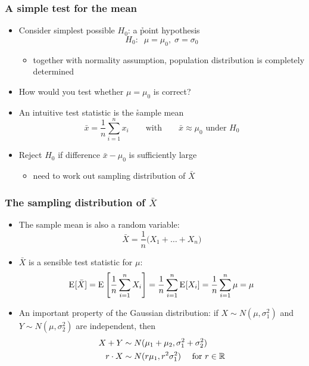 \documentclass[t]{beamer} %
\begin{document}
\begin{frame}
  \frametitle{A simple test for the mean}

  \begin{itemize}
  \item Consider simplest possible $H_0$: a \h{point hypothesis}
    \[
    H_0:\;\; \mu = \mu_0,\; \sigma = \sigma_0
    \]
    \ungap[1]
    \begin{itemize}
    \item[\hand] together with normality assumption, population distribution
      is completely determined
    \end{itemize}
  \item How would you test whether $\mu = \mu_0$ is correct?%
    \pause
  \item An intuitive test statistic is the \h{sample mean}
    \[
    \bar{x} = \frac{1}{n} \sum_{i=1}^n x_i
    \qquad \text{with} \qquad
    \bar{x}\approx \mu_0 \text{ under } H_0
    \]
  \item Reject $H_0$ if difference $\bar{x} - \mu_0$ is sufficiently large
    \begin{itemize}
    \item[\hand] need to work out sampling distribution of $\bar{X}$
    \end{itemize}
  \end{itemize}

\end{frame}

\begin{frame}
  \frametitle{The sampling distribution of $\bar{X}$}

  \begin{itemize}
  \item The sample mean is also a random variable:
    \[
    \bar{X} = \frac{1}{n} \bigl( X_1 + \dots + X_n \bigr)
    \]
  \item $\bar{X}$ is a sensible test statistic for $\mu$:
    \[
    \mathrm{E}_{}[\bar{X}] = \mathrm{E}_{}\left[ \frac{1}{n} \sum_{i=1}^n X_i \right]
    = \frac{1}{n} \sum_{i=1}^n \mathrm{E}_{}[X_i] 
    = \frac{1}{n} \sum_{i=1}^n \mu = \mu
    \]
    \pause
  \item An important property of the Gaussian distribution: if $X \sim N(\mu,
    \sigma^2_1)$ and $Y \sim N(\mu, \sigma^2_2)$ are independent, then
    \begin{align*}
      X + Y &\sim N(\mu_1 + \mu_2, \sigma^2_1 + \sigma^2_2)\\
      r\cdot X &\sim N(r\mu_1, r^2 \sigma^2_1) \quad \text{ for } r\in \mathbb{R}
    \end{align*}
  \end{itemize}

\end{frame}
\end{document}
